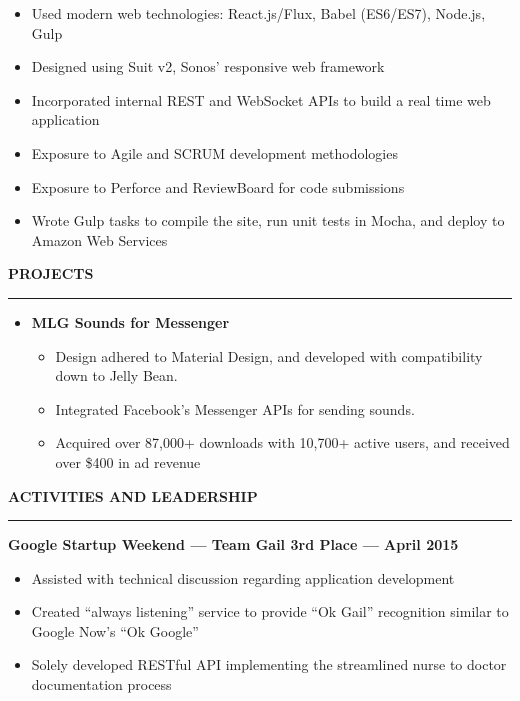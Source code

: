 \documentclass[10pt, oneside]{letter}
\newcommand{\linespaceshit} {
    \vspace{0.05in}
    \hrule
    \vspace{0.05in}
}
\begin{document}
\begin{adjustwidth}{0.1in}{0pt}
\begin{itemize}
\begin{itemize}
                            \item Used modern web technologies: React.js/Flux, Babel (ES6/ES7), Node.js, Gulp
                            \item Designed using Suit v2, Sonos' responsive web framework
                            \item Incorporated internal REST and WebSocket APIs to build a real time web application
                            \item Exposure to Agile and SCRUM development methodologies
                            \item Exposure to Perforce and ReviewBoard for code submissions
                            \item Wrote Gulp tasks to compile the site, run unit tests in Mocha, and deploy to Amazon Web Services
                        \end{itemize}
            \end{itemize}

        \end{adjustwidth}

    \textbf{PROJECTS}
    \linespaceshit{}
        \begin{adjustwidth}{0.2in}{0pt}
            \begin{itemize}
                \item \textbf{MLG Sounds for Messenger}
                    \begin{itemize}
                        \item Design adhered to Material Design, and developed with compatibility down to Jelly Bean.
                        \item Integrated Facebook's Messenger APIs for sending sounds.
                        \item Acquired over 87,000+ downloads with 10,700+ active users, and received over \$400 in ad revenue
                    \end{itemize}

            \end{itemize}
        \end{adjustwidth}

    \textbf{ACTIVITIES AND LEADERSHIP}
    \linespaceshit{}
        \textbf{Google Startup Weekend --- Team Gail 3rd Place --- April 2015}
        \begin{adjustwidth}{0.2in}{0pt}
            \begin{itemize}
                \item Assisted with technical discussion regarding application development
                \item Created ``always listening'' service to provide ``Ok Gail'' recognition similar to Google Now's ``Ok Google''
                \item Solely developed RESTful API implementing the streamlined nurse to doctor documentation process
            \end{itemize}
        \end{adjustwidth}
\end{document}
